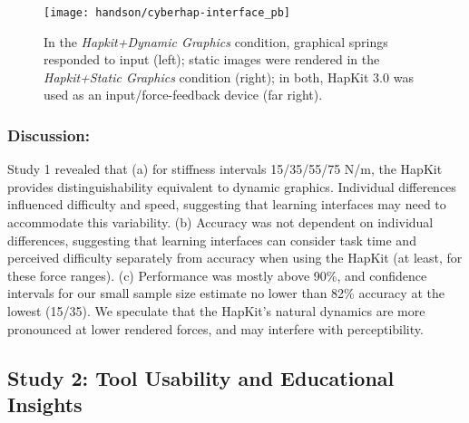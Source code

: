 \begin{figure} [tb]
  \centering
  \texttt{[image: handson/cyberhap-interface\_pb]}
  \caption{In the \textit{Hapkit+Dynamic Graphics} condition, graphical springs responded to input (left); static images were rendered in the \textit{Hapkit+Static Graphics} condition (right); in both, HapKit 3.0 \cite{Martinez2016} was used as an input/force-feedback device (far right).}
  \label{fig:study1-hapkit}
\end{figure}

\subsubsection{Discussion:}
Study 1 revealed that (a) for stiffness intervals 15/35/55/75 N/m, the HapKit  provides  distinguishability equivalent to  dynamic graphics.
Individual differences influenced difficulty and speed, 
 suggesting that learning interfaces may need to accommodate this variability. %
(b) Accuracy was not dependent on individual differences, suggesting that learning interfaces can consider task time and perceived difficulty separately from accuracy when using the HapKit (at least, for these force ranges).
(c) Performance was mostly above 90\%, and confidence intervals for our small sample size estimate no lower than 82\% accuracy at the lowest (15/35). 
We speculate that the HapKit's natural dynamics are more pronounced at lower rendered forces, and may interfere with perceptibility. 
%
\subsection{Study 2: Tool Usability and Educational Insights}

%
